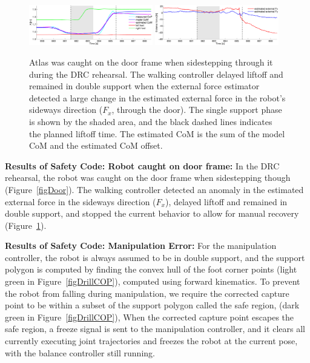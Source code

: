 \documentclass[letterpaper,12pt,fullpage]{article}
\begin{document}
\begin{figure}[t]
      \centering
\subfigure
{\includegraphics[width=0.48\textwidth]{figs/cop_x1.pdf} \label{subfig:ext_cop_x}}
\subfigure
{\includegraphics[width=0.48\textwidth]{figs/ext_f1.pdf} \label{subfig:ext_f}}
\caption{
Atlas was caught on the door frame when sidestepping through it during
the DRC rehearsal.
The walking controller delayed liftoff and remained in double
support when the external force estimator detected a large change
in the estimated external force in the robot's sideways
direction ($F_x$, through the door).
The single support phase is shown by the shaded area, and the black dashed
lines indicates the planned liftoff time.
The estimated CoM is the sum of the model CoM and the estimated CoM offset.
}
\label{figDoorError}
\end{figure}

{\bf Results of Safety Code: Robot caught on door frame:}
In the DRC rehearsal, the robot was caught on
the door frame when sidestepping though (Figure~\ref{figDoor}).
The walking
controller detected an anomaly in the estimated external force in the
sideways direction ($F_x$),
delayed liftoff and remained in double support, and stopped the
current behavior
to allow for manual recovery (Figure~\ref{figDoorError}).

{\bf Results of Safety Code: Manipulation Error:}
For the manipulation controller, the robot is always assumed
to be in double support, and the support polygon
is computed by finding the convex hull of the foot corner
points (light green in Figure~\ref{figDrillCOP}),
computed using forward kinematics.
To prevent the robot from falling during
manipulation, we require the corrected capture point to be within a
subset of the support polygon called the safe region, 
(dark green in Figure~\ref{figDrillCOP}),
When the corrected capture point escapes the safe region,
a freeze signal is sent to the manipulation controller, and it
clears all currently executing joint trajectories and freezes the robot
at the current pose, with the balance controller still running.
\end{document}
